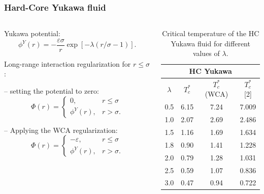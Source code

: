 \documentclass[8pt]{beamer}
\begin{document}
	\begin{frame}
		\frametitle{Hard-Core Yukawa fluid}
		
		\begin{columns}
			\begin{column}{0.5\textwidth}
				Yukawa potential:
				\begin{equation*}
					\label{def:yukawa}
					\phi^Y(r) = -\frac{\varepsilon \sigma}{r} \exp[-\lambda(r/\sigma - 1)].
				\end{equation*}
				
				Long-range interaction regularization for $r \leq \sigma$:
				\hfill
				\\
				\hfill
				
				-- setting the potential to zero:
				\begin{equation*}
					\Phi(r) = \left\{
					\begin{array}{ll}
						0, & r \leq \sigma 
						\\
						\phi^Y(r), & r > \sigma.
					\end{array}
					\right.
				\end{equation*}
				
				-- Applying the WCA regularization:
				\begin{equation*}
					\Phi(r) = \left\{
					\begin{array}{ll}
						-\varepsilon, & r \leq \sigma 
						\\
						\phi^Y(r), & r > \sigma.
					\end{array}
					\right.
				\end{equation*}
				
			\end{column}
			
			\begin{column}{0.5\textwidth}
				
				\begin{table}[h]
					\noindent\caption{Critical temperature of the HC Yukawa fluid for different values of $\lambda$.}\vskip3mm
					\begin{tabular}{|c|c|c|c|}
						\hline
						\multicolumn{4}{|c|}{HC Yukawa}\\
						\hline
						$\lambda$ & $T_c^*$ & $T_c^*$ (WCA)& $T_c^*$ [2] \\
						\hline
						0.5 & 6.15 & 7.24 & 7.009 \\
						1.0 & 2.07 & 2.69 & 2.486 \\
						1.5 & 1.16 & 1.69 & 1.634 \\
						1.8 & 0.90 & 1.41 & 1.228 \\
						2.0 & 0.79 & 1.28 & 1.031 \\
						2.5 & 0.59 & 1.07 & 0.836 \\
						3.0 & 0.47 & 0.94 & 0.722 \\
						\hline
					\end{tabular}
					\label{tab:yukawa_temp_cr}
				\end{table}
				

\end{column}
\end{columns}
\end{frame}
\end{document}
